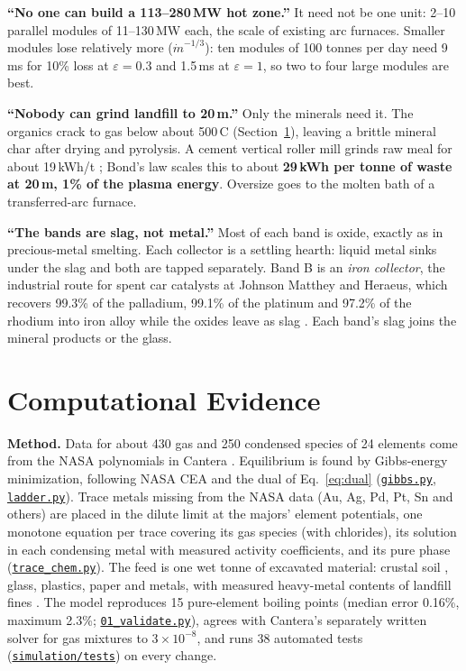 \documentclass[11pt,a4paper]{article}
\newcommand{\gh}[2]{\href{https://github.com/syncaissa/paramanu-reclaimer/blob/main/#1}{\texttt{#2}}}
\theoremstyle{definition}
\theoremstyle{plain}
\theoremstyle{remark}
\begin{document}
\textbf{``No one can build a 113--280\,MW hot zone.''} It need not be one unit: 2--10 parallel modules of 11--130\,MW each, the scale of existing arc furnaces. Smaller modules lose relatively more ($\dot m^{-1/3}$): ten modules of 100 tonnes per day need 9\,ms for 10\% loss at $\varepsilon = 0.3$ and 1.5\,ms at $\varepsilon = 1$, so two to four large modules are best.

\textbf{``Nobody can grind landfill to 20\,\textmu m.''} Only the minerals need it. The organics crack to gas below about 500\,\textdegree C (Section~\ref{sec:evidence}), leaving a brittle mineral char after drying and pyrolysis. A cement vertical roller mill grinds raw meal for about 19\,kWh/t \citep{jca_vrm}; Bond's law scales this to about \textbf{29\,kWh per tonne of waste at 20\,\textmu m, 1\% of the plasma energy}. Oversize goes to the molten bath of a transferred-arc furnace.

\textbf{``The bands are slag, not metal.''} Most of each band is oxide, exactly as in precious-metal smelting. Each collector is a settling hearth: liquid metal sinks under the slag and both are tapped separately. Band B is an \emph{iron collector}, the industrial route for spent car catalysts at Johnson Matthey and Heraeus, which recovers 99.3\% of the palladium, 99.1\% of the platinum and 97.2\% of the rhodium into iron alloy while the oxides leave as slag \citep{liu2026pgm}. Each band's slag joins the mineral products or the glass.

\section{Computational Evidence}\label{sec:evidence}

\textbf{Method.} Data for about 430 gas and 250 condensed species of 24 elements come from the NASA polynomials \citep{mcbride2002} in Cantera \citep{cantera2023}. Equilibrium is found by Gibbs-energy minimization, following NASA CEA \citep{gordon1994} and the dual of Eq.~\ref{eq:dual} (\gh{simulation/paramanu_sim/gibbs.py}{gibbs.py}, \gh{simulation/paramanu_sim/ladder.py}{ladder.py}). Trace metals missing from the NASA data (Au, Ag, Pd, Pt, Sn and others) are placed in the dilute limit at the majors' element potentials, one monotone equation per trace covering its gas species (with chlorides), its solution in each condensing metal with measured activity coefficients, and its pure phase (\gh{simulation/paramanu_sim/trace_chem.py}{trace\_chem.py}). The feed is one wet tonne of excavated material: crustal soil \citep{rudnick2003}, glass, plastics, paper and metals, with measured heavy-metal contents of landfill fines \citep{vollprecht2020}. The model reproduces 15 pure-element boiling points (median error 0.16\%, maximum 2.3\%; \gh{simulation/scripts/01_validate.py}{01\_validate.py}), agrees with Cantera's separately written solver for gas mixtures to $3\times10^{-8}$, and runs 38 automated tests (\gh{simulation/tests}{simulation/tests}) on every change.
\end{document}
